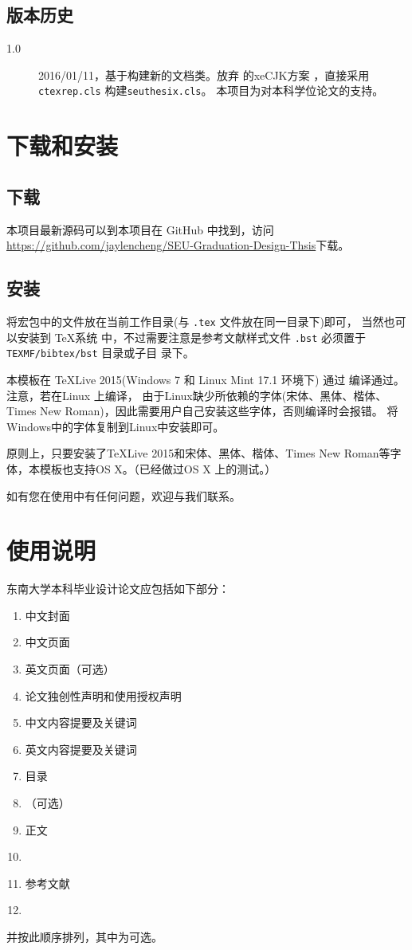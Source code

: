 \documentclass[openany,masters]{seucata}
\begin{document}
\section{版本历史}
\begin{description}
\item[1.0] 2016/01/11，基于\seuthesis 构建新的\seuthesix 文档类。放弃\seuthesis 
的xeCJK方案 ，直接采用\verb+ctexrep.cls+ 构建\verb+seuthesix.cls+。
本项目为对本科学位论文的支持。
\end{description}
                   
\chapter{下载和安装}  
\section{下载}     
本项目最新源码可以到本项目在 GitHub 中找到，访问
\url{https://github.com/jaylencheng/SEU-Graduation-Design-Thsis}下载。

\section{安装}
将宏包中的文件放在当前工作目录(与 \verb+.tex+ 文件放在同一目录下)即可，
当然也可以安装到 \TeX 系统
中，不过需要注意是参考文献样式文件 \verb+.bst+ 必须置于 \verb+TEXMF/bibtex/bst+ 目录或子目
录下。

本模板在 \TeX{Live} 2015(Windows 7 和 Linux Mint 17.1 环境下) 通过 编译通过。注意，若在Linux 上编译，
由于Linux缺少所依赖的字体(宋体、黑体、楷体、Times New Roman)，因此需要用户自己安装这些字体，否则编译时会报错。
将Windows中的字体复制到Linux中安装即可。

原则上，只要安装了\TeX{Live} 2015和宋体、黑体、楷体、Times New Roman等字体，本模板也支持OS X。（已经做过OS X 上的测试。）

如有您在使用中有任何问题，欢迎与我们联系。

\chapter{使用说明}
东南大学本科毕业设计论文应包括如下部分：\\
\begin{enumerate}
\itshape
\item 中文封面
\item 中文页面
\item 英文页面（可选）
\item 论文独创性声明和使用授权声明
\item 中文内容提要及关键词
\item 英文内容提要及关键词
\item 目录
\item {}（可选）
\item 正文
\item {}
\item 参考文献
\item  {}
\end{enumerate}
并按此顺序排列，其中为可选。
\end{document}
